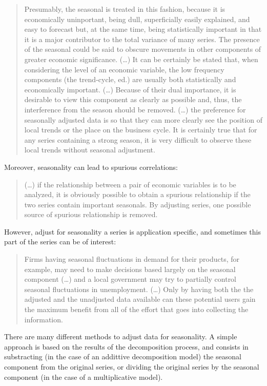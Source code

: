 \documentclass[
]{article}
\begin{document}
\begin{quote}
Presumably, the seasonal is treated in this fashion, because it is economically uninportant, being dull, superficially easily explained, and easy to forecast but, at the same time, being statistically important in that it is a major contributor to the total variance of many series. The presence of the seasonal could be said to obscure movements in other components of greater economic significance. (\ldots) It can be certainly be stated that, when considering the level of an economic variable, the low frequency components (the trend-cycle, ed.) are usually both statistically and economically important. (\ldots) Because of their dual importance, it is desirable to view this component as clearly as possible and, thus, the interference from the season should be removed. (\ldots) the preference for seasonally adjusted data is so that they can more clearly see the position of local trends or the place on the business cycle. It is certainly true that for any series containing a strong season, it is very difficult to observe these local trends without seasonal adjustment.
\end{quote}

Moreover, seasonality can lead to spurious correlations:

\begin{quote}
(\ldots) if the relationship between a pair of economic variables is to be analyzed, it is obviously possible to obtain a spurious relationship if the two series contain important seasonals. By adjusting series, one possible source of spurious relationship is removed.
\end{quote}

However, adjust for seasonality a series is application specific, and sometimes this part of the series can be of interest:

\begin{quote}
Firms having seasonal fluctuations in demand for their products, for example, may need to make decisions based largely on the seasonal component (\ldots) and a local government may try to partially control seasonal fluctuations in unemployment. (\ldots) Only by having both the the adjusted and the unadjusted data available can these potential users gain the maximum benefit from all of the effort that goes into collecting the information.
\end{quote}

There are many different methods to adjust data for seasonality. A simple approach is based on the results of the decomposition process, and consists in substracting (in the case of an addittive decomposition model) the seasonal component from the original series, or dividing the original series by the seasonal component (in the case of a multiplicative model).
\end{document}
